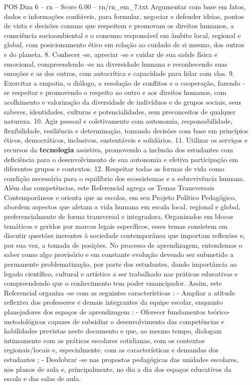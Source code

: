 \begin{textsample}{POS Dim 6 – rn – Score 6.00 – rn/rn\_em\_7.txt}
Argumentar com base em fatos, dados e informações confiáveis, para formular, negociar e defender ideias, pontos de vista e decisões comuns que respeitem e promovam os direitos humanos, a consciência socioambiental e o consumo responsável em âmbito local, regional e global, com posicionamento ético em relação ao cuidado de si mesmo, dos outros e do planeta. 8.
Conhecer -se, apreciar -se e cuidar de sua saúde física e emocional, compreendendo -se na diversidade humana e reconhecendo suas emoções e as dos outros, com autocrítica e capacidade para lidar com elas. 9.
Exercitar a empatia, o diálogo, a resolução de conflitos e a cooperação, fazendo -se respeitar e promovendo o respeito ao outro e aos direitos humanos, com acolhimento e valorização da diversidade de indivíduos e de grupos sociais, seus saberes, identidades, culturas e potencialidades, sem preconceitos de qualquer natureza. 10.
Agir pessoal e coletivamente com autonomia, responsabilidade, flexibilidade, resiliência e determinação, tomando decisões com base em princípios éticos, democráticos, inclusivos, sustentáveis e solidários. 11.
Utilizar os serviços e recursos da \textbf{tecnologia} assistiva, promovendo a inclusão dos estudantes com deficiência para o desenvolvimento de sua autonomia e efetiva participação em diferentes grupos e contextos. 12.
Respeitar todas as formas de vida como condição necessária para o equilíbrio dos ecossistemas e a sobrevivência humana.
Além das competências, este Referencial agrega os Temas Transversais Contemporâneos e orienta que as escolas, em seu Projeto Político Pedagógico, abordem aspectos que afetam a vida humana em escala local, regional e global, preferencialmente de forma transversal e integradora.
Organizados em blocos temáticos e geridos por marcos legais específicos, esses temas consistem em discutir questões inerentes à sociedade contemporânea que importam reflexões e, por sua vez, a tomada de posições.
No processo de aprendizagem, entendemos o saber como algo provisório e em constante evolução devendo ser submetido a permanente problematização, por parte dos estudantes, dando importância ao legado científico, cultural e artístico a ser trabalhado nas práticas educativas e compreendendo que o conhecimento tem poder emancipador.
Assim, este Referencial organiza -se com as seguintes características : - Ampliar a atitude reflexiva dos professores e demais integrantes da equipe escolar, enquanto planejadores dos espaços de aprendizagem ; - Oferecer fundamentos teórico-metodológicos capazes de subsidiar o desenvolvimento das competências e habilidades previstas neste documento e que, ao mesmo tempo, dialogam intimamente com as práticas escolares cotidianas, com os contextos regionais/locais e, especialmente, com as características e demandas dos estudantes ; - Desdobrar -se nas propostas pedagógicas das unidades escolares, nos planos de aula e, principalmente, no dia a dia dos espaços educativos da escola e das salas de aula.

\end{textsample}
